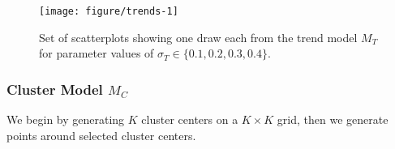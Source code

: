 \documentclass[12pt]{article}\usepackage[]{graphicx}\usepackage[]{color}
\newenvironment{knitrout}{}{} %
\begin{document}
\begin{figure}[ht]
\begin{knitrout}
\color{fgcolor}

{\centering \texttt{[image: figure/trends-1]} 

}



\end{knitrout}
\caption[Parameters affecting $M_T$]{\label{fig:trends} Set of scatterplots showing one draw each from the trend model $M_T$ for parameter values of  $\sigma_T \in \{0.1, 0.2, 0.3, 0.4\}$.}
\end{figure}

\subsubsection{Cluster Model \texorpdfstring{$M_C$}{Mc}} 
We begin by generating $K$ cluster centers on a $K \times K$ grid, then we generate points around selected cluster centers. 
\end{document}
